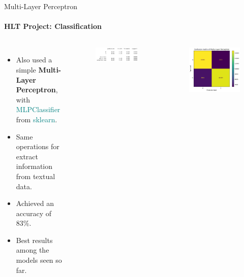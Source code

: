 \documentclass{beamer}
\theoremstyle{definition}
\theoremstyle{plain}
\begin{document}
\begin{frame}{Multi-Layer Perceptron}
\framesubtitle{HLT Project: Classification}

\begin{columns}
    \vspace{-1cm}
    {\small 
        \begin{itemize}
            \item Also used a simple \textbf{Multi-Layer Perceptron}, with \textcolor{teal}{MLPClassifier} from \textcolor{teal}{sklearn}.
            \item Same operations for extract information from textual data.
            \item Achieved an accuracy of 83\%.
            \item Best results among the models seen so far.
        \end{itemize}
    }

    \vspace{-0.3cm}
    \begin{figure}
        \centering
        \includegraphics[scale=0.4]{Figures/MLP-acc.png}
    \end{figure}
    \vspace{-0.3cm}
    \begin{figure}
        \centering
        \includegraphics[scale=0.35]{Figures/MultyLayer Perceptron.png}
    \end{figure}
\end{columns}
\end{frame}
\end{document}
